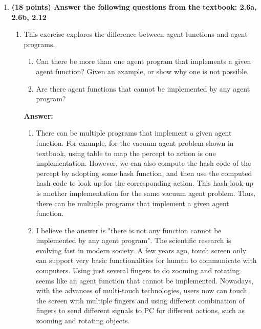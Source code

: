 \documentclass{article}%
\begin{document}
\begin{enumerate}
\item \textbf{(18 points) Answer the following questions from the textbook: 2.6a, 2.6b, 2.12}

	\begin{enumerate}
	\item This exercise explores the difference between agent functions and agent programs.

		\begin{enumerate}
		\item Can there be more than one agent program that implements a given agent function? Given an example, or show why one is not possible.
		\item Are there agent functions that cannot be implemented by any agent program?
		\end{enumerate}

\textbf{	Answer:}
		\begin{enumerate}
		\item There can be multiple programs that implement a given agent function. For example, for the vacuum agent problem shown in textbook, using table to map the percept to action is one implementation. However, we can also compute the hash code of the percept by adopting some hash function, and then use the computed hash code to look up for the corresponding action. This hash-look-up is another implementation for the same vacuum agent problem. Thus,  there can be multiple programs that implement a given agent function. 
		\item I believe the answer is "there is not any function cannot be implemented by any agent program". The scientific research is evolving fast in modern society. A few years ago, touch screen only can support very basic functionalities for human to communicate with computers. Using just several fingers to do zooming and rotating seems like an agent function that cannot be implemented. Nowadays, with the advances of multi-touch technologies, users now can touch the screen with multiple fingers and using different combination of fingers to send different signals to PC for different actions, such as zooming and rotating objects. 
		\end{enumerate}


\end{enumerate}
\end{enumerate}
\end{document}
